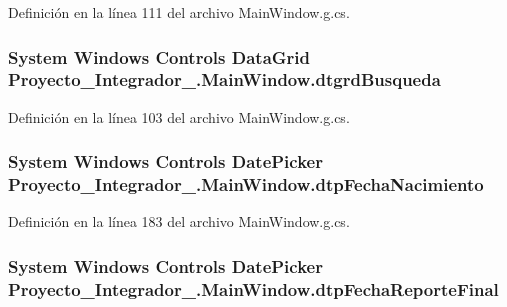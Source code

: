 Definición en la línea 111 del archivo Main\-Window.\-g.\-cs.

\hypertarget{class_proyecto___integrador__3_1_1_main_window_aa4ad8e119bd619ccc03b22de048dfe57}{
\subsubsection[{dtgrd\-Busqueda}]{\setlength{\rightskip}{0pt plus 5cm}System Windows Controls Data\-Grid Proyecto\-\_\-\-Integrador\-\_.\-Main\-Window.\-dtgrd\-Busqueda\hspace{0.3cm}{\ttfamily [package]}}}\label{class_proyecto___integrador__3_1_1_main_window_aa4ad8e119bd619ccc03b22de048dfe57}


Definición en la línea 103 del archivo Main\-Window.\-g.\-cs.

\hypertarget{class_proyecto___integrador__3_1_1_main_window_a366d1c04863cd090fb2a941de8adbd3d}{
\subsubsection[{dtp\-Fecha\-Nacimiento}]{\setlength{\rightskip}{0pt plus 5cm}System Windows Controls Date\-Picker Proyecto\-\_\-\-Integrador\-\_.\-Main\-Window.\-dtp\-Fecha\-Nacimiento\hspace{0.3cm}{\ttfamily [package]}}}\label{class_proyecto___integrador__3_1_1_main_window_a366d1c04863cd090fb2a941de8adbd3d}


Definición en la línea 183 del archivo Main\-Window.\-g.\-cs.

\hypertarget{class_proyecto___integrador__3_1_1_main_window_a19406fef8f65f2f4b8465a1581b6fa2d}{
\subsubsection[{dtp\-Fecha\-Reporte\-Final}]{\setlength{\rightskip}{0pt plus 5cm}System Windows Controls Date\-Picker Proyecto\-\_\-\-Integrador\-\_.\-Main\-Window.\-dtp\-Fecha\-Reporte\-Final\hspace{0.3cm}{\ttfamily [package]}}}\label{class_proyecto___integrador__3_1_1_main_window_a19406fef8f65f2f4b8465a1581b6fa2d}



